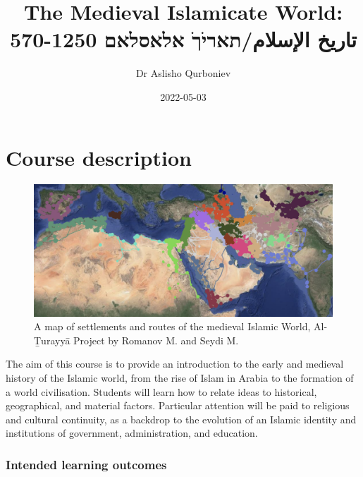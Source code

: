 \documentclass[
]{book}
\title{The Medieval Islamicate World: 570-1250 تاريخ الإسلام/תאריֹךֹ אלאסלאם}
\author{Dr Aslisho Qurboniev}
\date{2022-05-03}
\begin{document}
\maketitle

{
\setcounter{tocdepth}{1}
\tableofcontents
}
\hypertarget{course-description}{%
\chapter*{Course description}\label{course-description}}

\begin{figure}
\centering
\includegraphics{./files/map.png}
\caption{A map of settlements and routes of the medieval Islamic World, Al-Ṯurayyā Project by Romanov M. and Seydi M.}
\end{figure}

The aim of this course is to provide an introduction to the early and medieval history of the Islamic world, from the rise of Islam in Arabia to the formation of a world civilisation. Students will learn how to relate ideas to historical, geographical, and material factors. Particular attention will be paid to religious and cultural continuity, as a backdrop to the evolution of an Islamic identity and institutions of government, administration, and education.

\hypertarget{intended-learning-outcomes}{%
\subsection*{Intended learning outcomes}\label{intended-learning-outcomes}}
\end{document}
